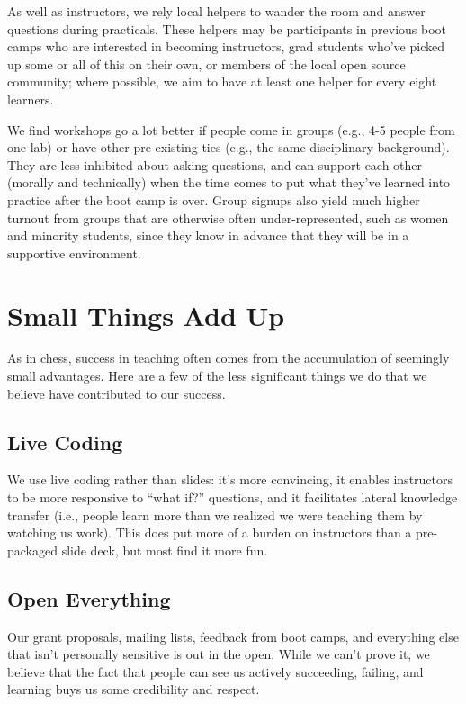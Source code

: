 \documentclass[10pt,a4paper,twocolumn]{article}
\begin{document}
As well as instructors, we rely local helpers to wander the room and
answer questions during practicals. These helpers may be participants in
previous boot camps who are interested in becoming instructors, grad
students who've picked up some or all of this on their own, or members
of the local open source community; where possible, we aim to have at
least one helper for every eight learners.

We find workshops go a lot better if people come in groups (e.g., 4-5
people from one lab) or have other pre-existing ties (e.g., the same
disciplinary background). They are less inhibited about asking
questions, and can support each other (morally and technically) when the
time comes to put what they've learned into practice after the boot camp
is over. Group signups also yield much higher turnout from groups that
are otherwise often under-represented, such as women and minority
students, since they know in advance that they will be in a supportive
environment.

\section*{Small Things Add Up}

As in chess, success in teaching often comes from the accumulation of
seemingly small advantages. Here are a few of the less significant
things we do that we believe have contributed to our success.

\subsection*{Live Coding}

We use live coding rather than slides: it's more convincing, it enables
instructors to be more responsive to ``what if?'' questions, and it
facilitates lateral knowledge transfer (i.e., people learn more than we
realized we were teaching them by watching us work). This does put more
of a burden on instructors than a pre-packaged slide deck, but most find
it more fun.

\subsection*{Open Everything}

Our grant proposals, mailing lists, feedback from boot camps, and
everything else that isn't personally sensitive is out in the open.
While we can't prove it, we believe that the fact that people can see us
actively succeeding, failing, and learning buys us some credibility and
respect.
\end{document}
